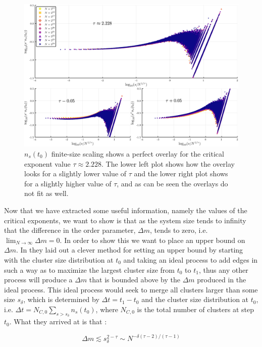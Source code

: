 \begin{figure}[H]
	\centering
	\includegraphics[width=350pt, clip]{images/fss_collapse_comparison.png}
	\caption{$n_s(t_0)$ finite-size scaling shows a perfect overlay for the critical exponent value $\tau \approx 2.228$. The lower left plot shows how the overlay looks for a slightly lower value of $\tau$ and the lower right plot shows for a slightly higher value of $\tau$, and as can be seen the overlays do not fit as well.}
	\label{fig:fss_collapse_comparison}
\end{figure}

Now that we have extracted some useful information, namely the values of the critical exponents, we want to show is that as the system size tends to infinity that the difference in the order parameter, $\Delta m$, tends to zero, i.e. $\lim_{N \rightarrow \infty} \Delta m = 0$.
In order to show this we want to place an upper bound on $\Delta m$. In \cite{Lee_1} they laid out a clever method for setting an upper bound by starting with the cluster size distribution at $t_0$ and taking an ideal process to add edges in such a way as to maximize the largest cluster size from $t_0$ to $t_1$, thus any other process will produce a $\Delta m$ that is bounded above by the $\Delta m$ produced in the ideal process.
This ideal process would seek to merge all clusters larger than some size $s_\delta$, which is determined by $\Delta t = t_1 - t_0$ and the cluster size distribution at $t_0$, i.e. $\Delta t = N_{C, 0} \sum_{s > s_\delta} n_s(t_0)$, where $N_{C, 0}$ is the total number of clusters at step $t_0$.
What they arrived at is that \cite{Lee_1}:

\begin{equation}
	\Delta m \lesssim s_\delta^{2 - \tau} \sim N^{-\delta (\tau - 2) / (\tau - 1)}
\end{equation}

